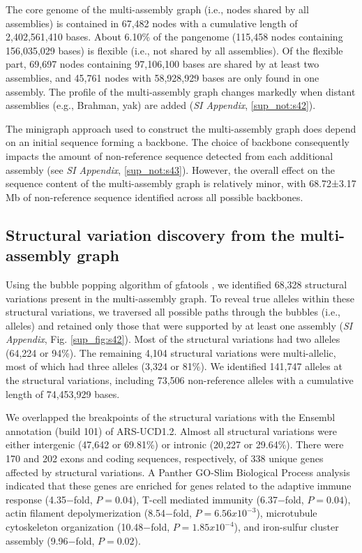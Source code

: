 \documentclass[../main.tex]{subfiles}
\begin{document}
The core genome of the multi-assembly graph (i.e., nodes shared by all assemblies) is contained in 67,482 nodes with a cumulative length of 2,402,561,410 bases. About 6.10\% of the pangenome (115,458 nodes containing 156,035,029 bases) is flexible (i.e., not shared by all assemblies). Of the flexible part, 69,697 nodes containing 97,106,100 bases are shared by at least two assemblies, and 45,761 nodes with 58,928,929 bases are only found in one assembly. The profile of the multi-assembly graph changes markedly when distant assemblies (e.g., Brahman, yak) are added (\emph{SI Appendix}, \ref{sup_not:s42}).

The minigraph approach used to construct the multi-assembly graph does depend on an initial sequence forming a backbone. The choice of backbone consequently impacts the amount of non-reference sequence detected from each additional assembly (see \emph{SI Appendix}, \ref{sup_not:s43}). However, the overall effect on the sequence content of the multi-assembly graph is relatively minor, with 68.72±3.17 Mb of non-reference sequence identified across all possible backbones.

\subsection*{Structural variation discovery from the multi-assembly graph}

Using the bubble popping algorithm of gfatools \citep{li2020design}, we identified 68,328 structural variations present in the multi-assembly graph. To reveal true alleles within these structural variations, we traversed all possible paths through the bubbles (i.e., alleles) and retained only those that were supported by at least one assembly (\emph{SI Appendix}, Fig. \ref{sup_fig:s42}). Most of the structural variations had two alleles (64,224 or 94\%). The remaining 4,104 structural variations were multi-allelic, most of which had three alleles (3,324 or 81\%). We identified 141,747 alleles at the structural variations, including 73,506 non-reference alleles with a cumulative length of 74,453,929 bases.  

We overlapped the breakpoints of the structural variations with the Ensembl annotation (build 101) of ARS-UCD1.2. Almost all structural variations were either intergenic (47,642 or 69.81\%) or intronic (20,227 or 29.64\%). There were 170 and 202 exons and coding sequences, respectively, of 338 unique genes affected by structural variations. A Panther GO-Slim Biological Process \citep{mi2019panther} analysis indicated that these genes are enriched for genes related to the adaptive immune response (4.35$-$fold, $P=0.04$), T-cell mediated immunity (6.37$-$fold, $P=0.04$), actin filament depolymerization (8.54$-$fold, $P=6.56x10^{-3}$), microtubule cytoskeleton organization (10.48$-$fold, $P=1.85x10^{-4}$), and iron-sulfur cluster assembly (9.96$-$fold, $P=0.02$). 
\end{document}
